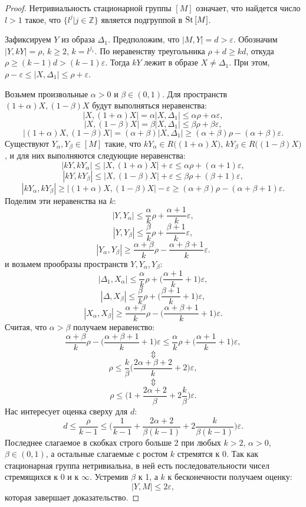 \begin{proof}
  Нетривиальность стационарной группы $[M]$ означает, что найдется
  число $l > 1$ такое, что $\{l^{j}|j\in \mathbb{Z}\}$ является подгруппой в
  $\operatorname{St}{[M]}$.

  Зафиксируем $Y$ из образа $\Delta_{1}$.
  Предположим, что $|M, Y| = d > \varepsilon$.  Обозначим
  $|Y, kY| = \rho$, $k \ge 2$, $k = l^{j_{1}}$. По неравенству
  треугольника $\rho + d \ge kd$,
  откуда $\rho \ge (k-1)d > (k-1)\varepsilon$. Тогда $kY$ лежит в образе
  $X \ne \Delta_1$. При этом,
  $\rho - \varepsilon \le |X, \Delta_1| \le \rho + \varepsilon$.

  Возьмем произвольные $\alpha > 0$ и $\beta \in (0,1)$. Для
  пространств $(1+\alpha)X, (1-\beta)X$ будут выполняться неравенства:
  $$|X, (1+\alpha)X| = \alpha |X, \Delta_1| \le \alpha\rho +
  \alpha\varepsilon,$$
  $$|X, (1-\beta)X| = \beta|X, \Delta_1| \le \beta\rho + \beta\varepsilon,$$
  $$|(1+\alpha) X, (1-\beta)X| = (\alpha + \beta)|X, \Delta_1| \ge
  (\alpha+\beta)\rho - (\alpha+\beta)\varepsilon.$$
  Существуют
  $Y_\alpha, Y_\beta \in [M]$ такие, что
  $kY_\alpha \in R\big((1+\alpha)X\big)$, $kY_\beta \in
  R\big((1-\beta)X\big)$, и
  для них выполняются следующие неравенства:
  $$|kY, kY_\alpha| \le |X, (1+\alpha)X| + \varepsilon \le \alpha\rho +
  (\alpha+1)\varepsilon,$$
  $$|kY, kY_\beta| \le |X, (1-\beta)X| + \varepsilon \le \beta\rho +
  (\beta+1)\varepsilon,$$
  $$|kY_\alpha, kY_\beta| \ge |(1+\alpha)X, (1-\beta)X| - \varepsilon
  \ge  (\alpha+\beta)\rho - (\alpha+\beta+1)\varepsilon.$$
  Поделим эти неравенства на $k$:
  $$|Y, Y_{\alpha}| \le \frac{\alpha}{k}\rho + \frac{\alpha+1}{k}\varepsilon,$$
  $$|Y, Y_{\beta}| \le \frac{\beta}{k}\rho + \frac{\beta+1}{k}\varepsilon,$$
  $$|Y_\alpha, Y_{\beta}| \ge \frac{\alpha+\beta}{k}\rho -
  \frac{\alpha+\beta+1}{k}\varepsilon.$$
  и возьмем прообразы пространств $Y, Y_{\alpha}, Y_{\beta}$:
  $$|\Delta_1, X_{\alpha}| \le \frac{\alpha}{k}\rho +
  \big(\frac{\alpha+1}{k} + 1\big)\varepsilon,$$
  $$|\Delta, X_{\beta}| \le \frac{\beta}{k}\rho +
  \big(\frac{\beta+1}{k}+1\big)\varepsilon,$$
  $$|X_\alpha, X_{\beta}| \ge \frac{\alpha+\beta}{k}\rho -
  \big(\frac{\alpha+\beta+1}{k}+1\big)\varepsilon.$$
  Считая, что $\alpha > \beta$ получаем неравенство:
  $$\frac{\alpha+\beta}{k}\rho -
  \big(\frac{\alpha+\beta+1}{k}+1\big)\varepsilon \le
  \frac{\alpha}{k}\rho + \big(\frac{\alpha+1}{k} + 1\big)\varepsilon,$$
  $$\Updownarrow$$
  $$\rho \le
  \frac{k}{\beta}\bigg(\frac{2\alpha+\beta+2}{k}+2\bigg)\varepsilon,$$
  $$\Updownarrow$$
  $$\rho \le \bigg(1+\frac{2\alpha + 2}{\beta} +
  2\frac{k}{\beta}\bigg)\varepsilon.$$
  Нас интересует оценка сверху для $d$:
  $$d \le \frac{\rho}{k-1} \le \bigg(\frac{1}{k-1}+\frac{2\alpha +
  2}{\beta(k-1)} + 2\frac{k}{\beta(k-1)}\bigg)\varepsilon. $$
  Последнее слагаемое в скобках строго больше 2 при любых $k>2$, $\alpha>0$,
  $\beta\in (0,1)$, а остальные слагаемые с ростом $k$ стремятся к
  $0$. Так как стационарная группа нетривиальна, в ней есть
  последовательности чисел стремящихся к 0 и к $\infty$.
  Устремив $\beta$ к 1, а $k$ к бесконечности получаем оценку:
  $$|Y, M| \le 2\varepsilon,$$
  которая завершает доказательство.

\end{proof}
